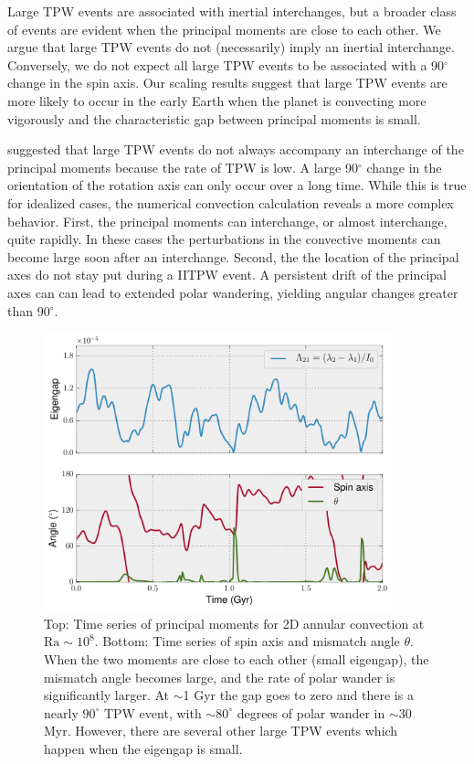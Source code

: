 \documentclass[preprint,12pt,authoryear]{elsarticle}
\begin{document}
Large TPW events are associated with inertial interchanges, but a broader class of events are evident
when the principal moments are close to each other. We argue that large TPW events do not (necessarily) imply an inertial interchange. Conversely, we do not expect all large TPW events to be associated with a 90$^{\circ}$ change in the spin axis. Our scaling results suggest that large TPW events are more likely to occur in the early Earth when the planet is convecting more vigorously and the characteristic gap between principal moments is small.


\citet{tsai2007theoretical} suggested that large TPW events do not always accompany an interchange of the principal moments because the rate of TPW is low. A large 90$^{\circ}$ change in the orientation of the rotation axis can only occur over a long time.  While
this is true for idealized cases, the numerical convection calculation reveals a more complex behavior. 
First, the principal moments can interchange, or almost interchange, quite rapidly. In these cases  the perturbations in the convective moments can become large soon after an interchange. Second, the
 the location of the principal axes do not stay put during a IITPW event. A persistent drift of the principal axes can can lead to extended polar wandering, yielding angular changes greater than 90$^\circ$.

\begin{figure}
\centering
\includegraphics[width=0.9\textwidth]{figures/misfit.pdf}
\caption{Top: Time series of principal moments for 2D annular convection at $\mathrm{Ra}\sim10^8$.  Bottom: Time series of spin axis and mismatch angle $\theta$.  When the two moments are close to each other (small eigengap), the mismatch angle becomes large, and the rate of polar wander is significantly larger. At $\sim$1 Gyr the gap goes to zero and there is a nearly $90^\circ$ TPW event, with $\sim80^\circ$ degrees of polar wander in $\sim$30 Myr. However, there are several other large TPW events which happen when the eigengap is small.}
\label{fig:misfit}
\end{figure}
\end{document}
